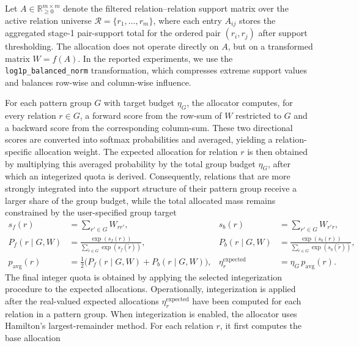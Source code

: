 \documentclass[12pt,a4paper]{article}
\begin{document}
Let $A \in \mathbb{R}_{\ge 0}^{m \times m}$ denote the filtered relation--relation support matrix over the active relation universe $\mathcal{R}=\{r_1,\dots,r_m\}$, where each entry $A_{ij}$ stores the aggregated stage-1 pair-support total for the ordered pair $(r_i,r_j)$ after support thresholding. The allocation does not operate directly on $A$, but on a transformed matrix $W=f(A)$. In the reported experiments, we use the \texttt{log1p\_balanced\_norm} transformation, which compresses extreme support values and balances row-wise and column-wise influence.

For each pattern group $G$ with target budget $\eta_G$, the allocator computes, for every relation $r \in G$, a forward score from the row-sum of $W$ restricted to $G$ and a backward score from the corresponding column-sum. These two directional scores are converted into softmax probabilities and averaged, yielding a relation-specific allocation weight. The expected allocation for relation $r$ is then obtained by multiplying this averaged probability by the total group budget $\eta_G$, after which an integerized quota is derived. Consequently, relations that are more strongly integrated into the support structure of their pattern group receive a larger share of the group budget, while the total allocated mass remains constrained by the user-specified group target
\begin{align*}
s_f(r) &= \sum_{r' \in G} W_{rr'}, &
s_b(r) &= \sum_{r' \in G} W_{r'r},\\
P_f(r\mid G,W)
&=
\frac{\exp(s_f(r))}
{\sum_{\tilde r \in G}\exp(s_f(\tilde r))}, &
P_b(r\mid G,W)
&=
\frac{\exp(s_b(r))}
{\sum_{\tilde r \in G}\exp(s_b(\tilde r))},\\
p_{\mathrm{avg}}(r)
&=
\frac{1}{2}\bigl(P_f(r\mid G,W)+P_b(r\mid G,W)\bigr), &
\eta^{\mathrm{expected}}_r
&=
\eta_G \, p_{\mathrm{avg}}(r).
\end{align*}
The final integer quota is obtained by applying the selected integerization procedure to the expected allocations. 
Operationally, integerization is applied after the real-valued expected allocations \(\eta^{\mathrm{expected}}_r\) have been computed for each relation in a pattern group. When integerization is enabled, the allocator uses Hamilton's largest-remainder method. For each relation \(r\), it first computes the base allocation
\end{document}
